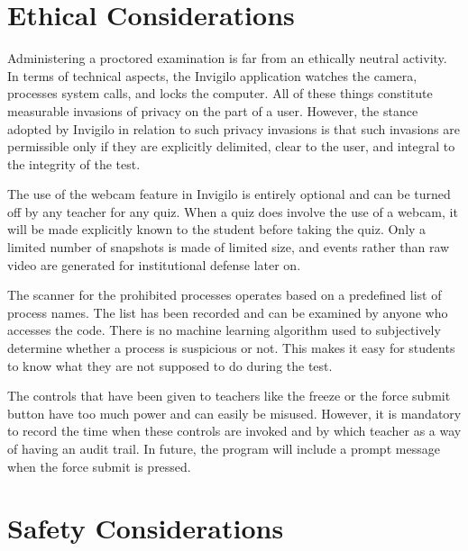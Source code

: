 \documentclass[12pt, a4paper]{report}
\begin{document}
\section{Ethical Considerations}

\begin{justify}
  {\fontsize{12}{18}\selectfont
    Administering a proctored examination is far from an ethically neutral activity. In terms of technical aspects, the Invigilo application watches the camera, processes system calls, and locks the computer. All of these things constitute measurable invasions of privacy on the part of a user. However, the stance adopted by Invigilo in relation to such privacy invasions is that such invasions are permissible only if they are explicitly delimited, clear to the user, and integral to the integrity of the test.

    The use of the webcam feature in Invigilo is entirely optional and can be turned off by any teacher for any quiz. When a quiz does involve the use of a webcam, it will be made explicitly known to the student before taking the quiz. Only a limited number of snapshots is made of limited size, and events rather than raw video are generated for institutional defense later on.

    The scanner for the prohibited processes operates based on a predefined list of process names. The list has been recorded and can be examined by anyone who accesses the code. There is no machine learning algorithm used to subjectively determine whether a process is suspicious or not. This makes it easy for students to know what they are not supposed to do during the test.

    The controls that have been given to teachers like the freeze or the force submit button have too much power and can easily be misused. However, it is mandatory to record the time when these controls are invoked and by which teacher as a way of having an audit trail. In future, the program will include a prompt message when the force submit is pressed.
  }
\end{justify}

\section{Safety Considerations}
\end{document}
